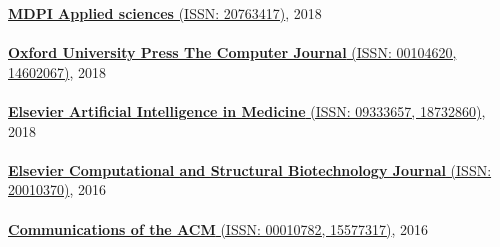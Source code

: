 \href{http://www.mdpi.com/journal/applsci}{\textbf{MDPI Applied sciences} (ISSN: 20763417)}, 2018
\\ \halfblankline \\
\href{https://academic.oup.com/comjnl}{\textbf{Oxford University Press The Computer Journal} (ISSN: 00104620, 14602067)}, 2018
\\ \halfblankline \\
\href{https://www.journals.elsevier.com/artificial-intelligence-in-medicine/}{\textbf{Elsevier Artificial Intelligence in Medicine} (ISSN: 09333657, 18732860)}, 2018
\\ \halfblankline \\
\href{https://www.journals.elsevier.com/computational-and-structural-biotechnology-journal/}{\textbf{Elsevier Computational and Structural Biotechnology Journal} (ISSN: 20010370)}, 2016
\\ \halfblankline \\
\href{http://cacm.acm.org/}{\textbf{Communications of the ACM} (ISSN: 00010782, 15577317)}, 2016
